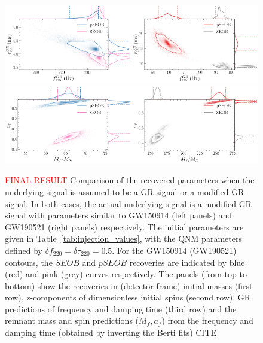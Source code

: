 \documentclass[twocolumn,prd,superscriptaddress,amsfonts,amssymb,amsmath,preprintnumbers]{revtex4-1}
\newcommand{\df}[1]{\delta f_{\text{#1}}}
\newcommand{\dtau}[1]{\delta \tau_{\text{#1}}}
\begin{document}
\begin{figure}[h!]
	\includegraphics[width=0.5\textwidth]{figures/GW150914_simulated_signal_0p5_gr_ngr_fgrtaugr.png}\includegraphics[width=0.5\textwidth]{figures/GW190521_simulated_signal_0p5_gr_ngr_fgrtaugr.png}
	\includegraphics[width=0.5\textwidth]{figures/GW150914_simulated_signal_0p5_gr_ngr_Mfaf.png}\includegraphics[width=0.5\textwidth]{figures/GW190521_simulated_signal_0p5_gr_ngr_Mfaf.png}
	\caption{\textcolor{red}{FINAL RESULT} Comparison of the recovered parameters when the underlying signal is assumed to be a GR signal or a modified GR signal. In both cases, the actual underlying signal is a modified GR signal with parameters similar to GW150914 (left panels) and GW190521 (right panels) respectively. The initial parameters are given in Table~\ref{tab:injection_values}, with the QNM parameters defined by $\df{220} = \dtau{220} = 0.5$. For the GW150914 (GW190521) contours, the $SEOB$ and $pSEOB$ recoveries are indicated by blue (red) and pink (grey) curves respectively. The panels (from top to bottom) show the recoveries in (detector-frame) initial masses (first row), z-components of dimensionless initial spins (second row), GR predictions of frequency and damping time (third row) and the remnant mass and spin predictions ($M_f, a_f$) from the frequency and damping time (obtained by inverting the Berti fits) CITE}
	\label{fig:gr_ngr_comparison}
\end{figure}


%


\end{document}
